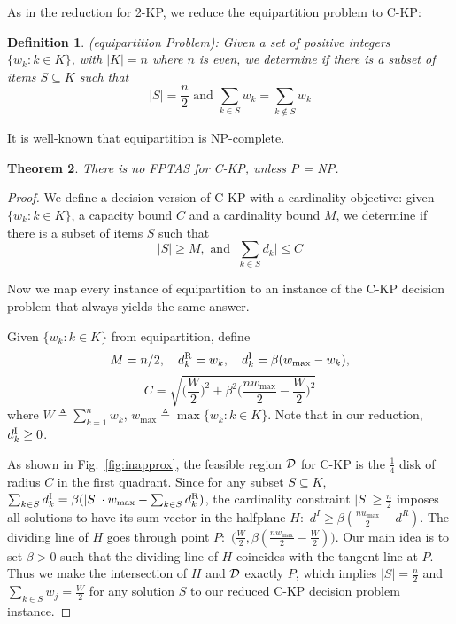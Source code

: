\documentclass{aamas2013}
\newtheorem{theorem}{Theorem}[section]
\newtheorem{definition}[theorem]{Definition}
\begin{document}
As in the reduction for 2-KP, we reduce the {\sc equipartition} problem to {\sc C-KP}:

\begin{definition} ({\sc equipartition} Problem): Given a set of positive integers $\{w_k: k \in K \}$, with $|K|=n$ where $n$ is even, we determine if there is a subset of items $S \subseteq K$ such that
\[
|S| = \frac{n}{2} \mbox{\ and\ } \sum_{k \in S} w_k = \sum_{k \notin S} w_k
\]
\end{definition}
It is well-known that {\sc equipartition} is NP-complete.


\begin{theorem}
There is no FPTAS for {\sc C-KP}, unless P = NP.
\end{theorem}
\begin{proof}
We define a decision version of {\sc C-KP} with a cardinality objective: given $\{w_k: k \in K \}$, a capacity bound $C$ and a cardinality bound $M$, we determine if there is a subset of items $S$ such that
\[
|S| \geq M, \mbox{\ and\ } \Big| \sum_{k\in S} d_k \Big| \le C
\]

Now we map every instance of {\sc equipartition} to an instance of the {\sc C-KP} decision problem that always yields the same answer.
  

Given $\{w_k: k \in K \}$ from {\sc equipartition}, define 
\[
M=n/2,\quad d_k^{\rm R} = w_k, \quad d_k^{\rm I} = \beta(w_{\max} -  w_k), 
\]
\[
C = \sqrt{ \Big( \frac{W}{2} \Big)^2 + \beta^2\Big( \frac{n w_{\max}}{2} -  \frac{W}{2} \Big)^2 }
\]
where $W \triangleq \sum_{k = 1}^{n} w_k$, $w_{\max} \triangleq \max \{ w_k: k \in K\}$.  Note that in our reduction, $d_k^{\rm I} \ge 0$.

As shown in Fig.~\ref{fig:inapprox}, the feasible region $\cal D$ for {\sc C-KP} is the $\frac{1}{4}$ disk of radius $C$ in the first quadrant.  Since for any subset $S\subseteq K$, 
$\sum_{k\in S} d_k^{\rm I}=\beta(|S|\cdot w_{\max}- \sum_{k\in S} d_k^{\rm R})$,
the cardinality constraint $|S|\geq \frac{n}{2}$ imposes all solutions to have its sum vector in the halfplane $H:$ $d^I\geq \beta(\frac{n w_{\max}}{2}- d^R)$.  The dividing line of $H$ goes through point $P:$ $\Big(\frac{W}{2} , \beta(\frac{n w_{\max}}{2} -  \frac{W}{2})\Big)$.  Our main idea is to set $\beta>0$ such that the dividing line of $H$ coincides with the tangent line at $P$.  Thus we make the intersection of $H$ and ${\cal D}$ exactly $P$, which implies    
$|S|=\frac{n}{2}$ and $\sum_{k \in S} w_j=\frac{W}{2}$ for any solution $S$ to our reduced {\sc C-KP} decision problem instance.


\end{proof}
\end{document}

